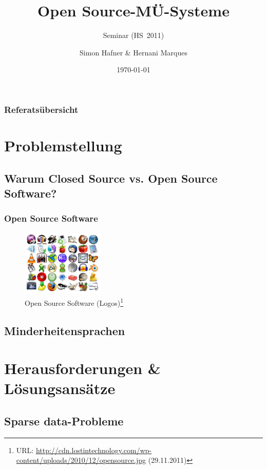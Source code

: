 \documentclass{clsemhs11-beamer}
\title{Open Source-MÜ-Systeme}
\subtitle{Seminar \q{Maschinelle \"Ubersetzung} (HS~2011)}
\author{Simon Hafner \& Hernani Marques}
\date{\today}
\begin{document}
  \maketitle


\begin{frame}
\frametitle{Referatsübersicht}
\tableofcontents
\end{frame}

\section{Problemstellung}
\subsection{Warum Closed Source vs. Open Source Software?}
\begin{frame}
\frametitle{Open Source Software}
\begin{figure}
  \includegraphics[width=0.35\textwidth]{graphics/ossmatrix}
  \caption{Open Source Software (Logos)\footnote{URL: \url{http://cdn.lostintechnology.com/wp-content/uploads/2010/12/opensource.jpg} (29.11.2011)}}
  \end{figure}
\end{frame}
\subsection{Minderheitensprachen}
\section{Herausforderungen \& Lösungsansätze}
\subsection{Sparse data-Probleme}
\end{document}
